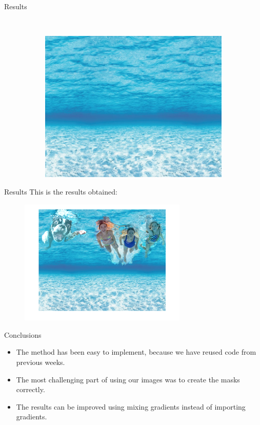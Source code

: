 \documentclass[11pt]{beamer}
\begin{document}
\begin{frame}{Results}
\begin{figure}
     ~ 
        \begin{subfigure}[b]{0.35\textwidth}
        \includegraphics[width=\textwidth]{the_sea}

    \end{subfigure}

\end{figure}
\end{frame}

\begin{frame}{Results}
This is the results obtained:
\begin{figure}
    \centering
    \includegraphics[width=80mm]{The_sea_modified}
\end{figure}
\end{frame}


\begin{frame}{Conclusions}
\begin{itemize}
    \item The method has been easy to implement, because we have reused code from previous weeks.
    \item The most challenging part of using our images was to create the masks correctly.
    \item The results can be improved using mixing gradients instead of importing gradients.
\end{itemize}    
\end{frame}
\end{document}
